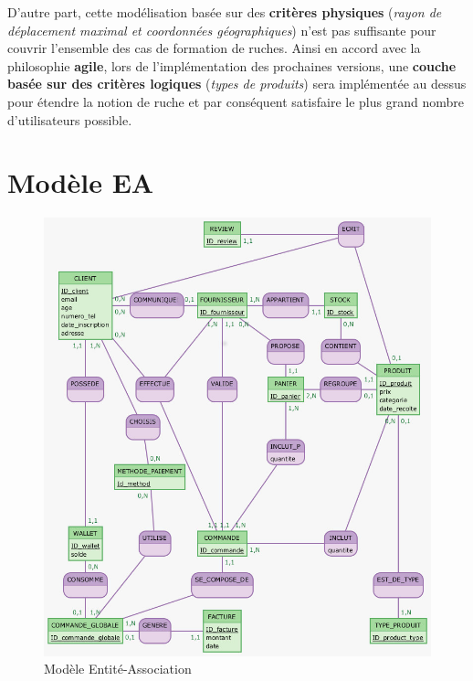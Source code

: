 \documentclass[a4paper,12pt]{report}
\theoremstyle{break}
\theoremstyle{break}
\theoremstyle{break}
\theoremstyle{break}
\theoremstyle{definition}
\theoremstyle{remark}
\begin{document}
D'autre part, cette modélisation basée sur des \textbf{critères physiques} (\textit{rayon de déplacement maximal et coordonnées géographiques}) n'est pas suffisante pour couvrir l'ensemble des cas de formation de ruches. Ainsi en accord avec la philosophie \textbf{agile}, lors de l'implémentation des prochaines versions, une \textbf{couche basée sur des critères logiques} (\textit{types de produits}) sera implémentée au dessus pour étendre la notion de ruche et par conséquent satisfaire le plus grand nombre d'utilisateurs possible.
\section{Modèle EA}
\begin{figure}[!ht]
  \centering
  \includegraphics[scale=0.6]{images/Clients.jpg}
  \caption{Modèle Entité-Association}
  \label{fig:modele_EA}
\end{figure}

\newpage
\end{document}
